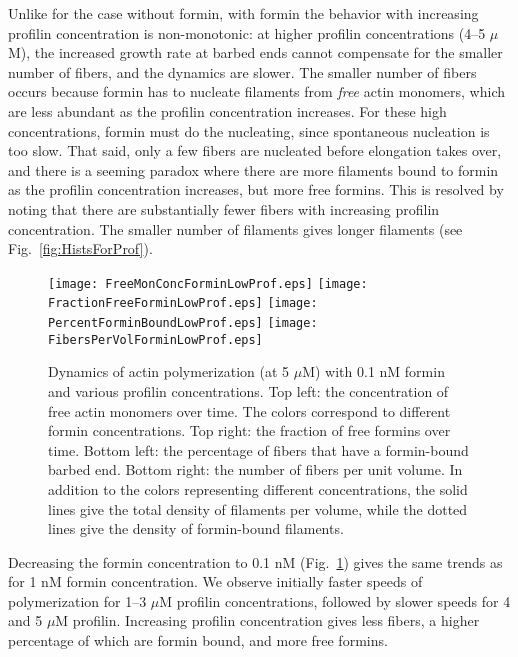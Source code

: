 \documentclass[11pt]{article}
\begin{document}
Unlike for the case without formin, with formin the behavior with increasing profilin concentration is non-monotonic: at higher profilin concentrations (4--5 $\mu$M), the increased growth rate at barbed ends cannot compensate for the smaller number of fibers, and the dynamics are slower. The smaller number of fibers occurs because formin has to nucleate filaments from \emph{free} actin monomers, which are less abundant as the profilin concentration increases. For these high concentrations, formin must do the nucleating, since spontaneous nucleation is too slow. That said, only a few fibers are nucleated before elongation takes over, and there is a seeming paradox where there are more filaments bound to formin as the profilin concentration increases, but more free formins. This is resolved by noting that there are substantially fewer fibers with increasing profilin concentration. The smaller number of filaments gives longer filaments (see Fig.\ \ref{fig:HistsForProf}).

\begin{figure}
\centering
\texttt{[image: FreeMonConcForminLowProf.eps]}
\texttt{[image: FractionFreeForminLowProf.eps]}
\texttt{[image: PercentForminBoundLowProf.eps]}
\texttt{[image: FibersPerVolForminLowProf.eps]}
\caption{\label{fig:ActinForLowProf}Dynamics of actin polymerization (at 5 $\mu$M) with 0.1 nM formin and various profilin concentrations. Top left: the concentration of free actin monomers over time. The colors correspond to different formin concentrations. Top right: the fraction of free formins over time. Bottom left: the percentage of fibers that have a formin-bound barbed end. Bottom right: the number of fibers per unit volume. In addition to the colors representing different concentrations, the solid lines give the total density of filaments per volume, while the dotted lines give the density of formin-bound filaments.}
\end{figure}

Decreasing the formin concentration to 0.1 nM (Fig.\ \ref{fig:ActinForLowProf}) gives the same trends as for 1 nM formin concentration. We observe initially faster speeds of polymerization for 1--3 $\mu$M profilin concentrations, followed by slower speeds for 4 and 5 $\mu$M profilin. Increasing profilin concentration gives less fibers, a higher percentage of which are formin bound, and more free formins. 
\end{document}
